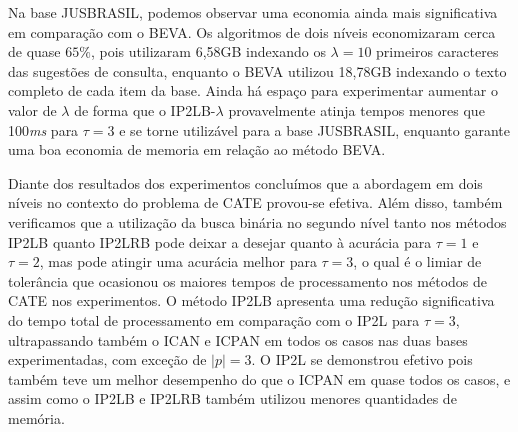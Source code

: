 Na base JUSBRASIL, podemos observar uma economia ainda mais significativa em comparação com o BEVA. Os algoritmos de dois níveis economizaram cerca de quase $65\%$, pois utilizaram 6,58GB indexando os $\lambda=10$ primeiros caracteres das sugestões de consulta, enquanto o BEVA utilizou 18,78GB indexando o texto completo de cada item da base. Ainda há espaço para experimentar aumentar o valor de $\lambda$ de forma que o IP2LB-$\lambda$ provavelmente atinja tempos menores que 100\textit{ms} para $\tau=3$ e se torne utilizável para a base JUSBRASIL, enquanto garante uma boa economia de memoria em relação ao método BEVA. 

Diante dos resultados dos experimentos concluímos que a abordagem em dois níveis no contexto do problema de CATE provou-se efetiva. Além disso, também verificamos que a utilização da busca binária no segundo nível tanto nos métodos IP2LB quanto IP2LRB pode deixar a desejar quanto à acurácia para $\tau=1$ e $\tau=2$, mas pode atingir uma acurácia melhor para $\tau=3$, o qual é o limiar de tolerância que ocasionou os maiores tempos de processamento nos métodos de CATE nos experimentos. O método IP2LB apresenta uma redução significativa do tempo total de processamento em comparação com o IP2L para $\tau=3$, ultrapassando também o ICAN e ICPAN em todos os casos nas duas bases experimentadas, com exceção de $|p|=3$. O IP2L se demonstrou efetivo pois também teve um melhor desempenho do que o ICPAN em quase todos os casos, e assim como o IP2LB e IP2LRB também utilizou menores quantidades de memória.